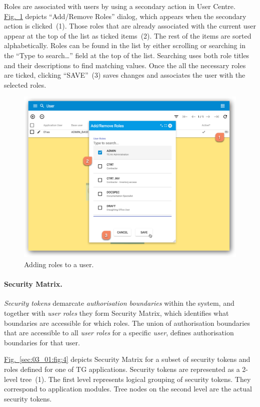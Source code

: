 \documentclass[a4paper,12pt,oneside,openright]{memoir}
\begin{document}
	Roles are associated with users by using a secondary action in User Centre.
	\hyperref[sec:03_01:fig:3]{Fig.~\ref*{sec:03_01:fig:3}} depicts ``Add/Remove Roles'' dialog, which appears when the secondary action is clicked~(1).
	Those roles that are already associated with the current user appear at the top of the list as ticked items~(2).
	The rest of the items are sorted alphabetically.
	Roles can be found in the list by either scrolling or searching in the ``Type to search\ldots'' field at the top of the list.
	Searching uses both role titles and their descriptions to find matching values.
	Once the all the necessary roles are ticked, clicking ``SAVE''~(3) saves changes and associates the user with the selected roles.

	\begin{figure}[h!tbp]
	\centering
	\includegraphics[width=0.8\linewidth]{images/08-adding-roles-to-users.png}
	\caption{Adding roles to a user.}\label{sec:03_01:fig:3}
	\end{figure}

	\paragraph{Security Matrix.}
	\emph{Security tokens} demarcate \emph{authorisation boundaries} within the system, and together with \emph{user roles} they form Security Matrix, which identifies what boundaries are accessible for which roles.
	The union of authorisation boundaries that are accessible to all  \emph{user roles} for a specific \emph{user}, defines authorisation boundaries for that user.

	\hyperref[sec:03_01:fig:4]{Fig.~\ref*{sec:03_01:fig:4}} depicts Security Matrix for a subset of security tokens and roles defined for one of TG applications.
	Security tokens are represented as a 2-level tree~(1).
	The first level represents logical grouping of security tokens.
	They correspond to application modules.
	Tree nodes on the second level are the actual security tokens.
\end{document}
